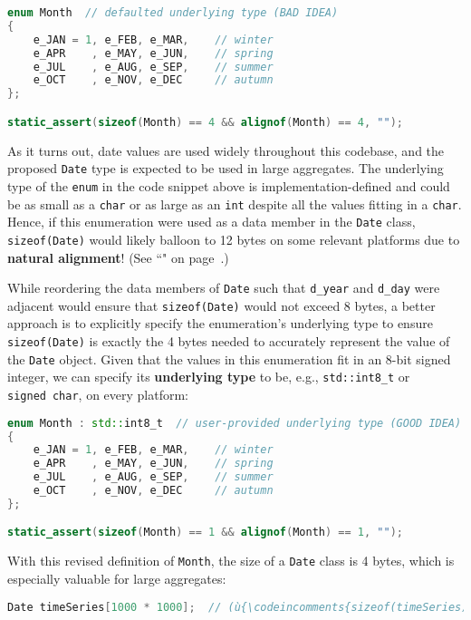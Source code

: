 \begin{lstlisting}[language=C++]
enum Month  // defaulted underlying type (BAD IDEA)
{
    e_JAN = 1, e_FEB, e_MAR,    // winter
    e_APR    , e_MAY, e_JUN,    // spring
    e_JUL    , e_AUG, e_SEP,    // summer
    e_OCT    , e_NOV, e_DEC     // autumn
};

static_assert(sizeof(Month) == 4 && alignof(Month) == 4, "");
\end{lstlisting}

\noindent As it turns out, date values are used widely throughout this codebase,
and the proposed \texttt{Date} type is expected to be used in large
aggregates. The underlying type of the \texttt{enum} in the code snippet
above is implementation-defined and could be as small as a \texttt{char}
or as large as an \texttt{int} despite all the values fitting in a
\texttt{char}. Hence, if this enumeration were used as a data member in
the \texttt{Date} class, \texttt{sizeof(Date)} would likely balloon to
12 bytes on some relevant platforms due to \textbf{natural alignment}!
(See ``" on page~\pageref{alignas}.)

While reordering the data members of \texttt{Date} such that \texttt{d\_year} and
\texttt{d\_day} were adjacent would ensure that \texttt{sizeof(Date)}
would not exceed 8 bytes, a better approach is to explicitly specify the
enumeration's underlying type to ensure \texttt{sizeof(Date)} is exactly
the 4 bytes needed to accurately represent the value of the
\texttt{Date} object. Given that the values in this enumeration fit in
an 8-bit signed integer, we can specify its \textbf{underlying type} to
be, e.g., \texttt{std::int8\_t} or \texttt{signed}~\texttt{char}, on
every platform:

\begin{lstlisting}[language=C++]
enum Month : std::int8_t  // user-provided underlying type (GOOD IDEA)
{
    e_JAN = 1, e_FEB, e_MAR,    // winter
    e_APR    , e_MAY, e_JUN,    // spring
    e_JUL    , e_AUG, e_SEP,    // summer
    e_OCT    , e_NOV, e_DEC     // autumn
};

static_assert(sizeof(Month) == 1 && alignof(Month) == 1, "");
\end{lstlisting}

\noindent With this revised definition of \texttt{Month}, the size of a
\texttt{Date} class is 4 bytes, which is especially valuable for large
aggregates:

\begin{lstlisting}[language=C++]
Date timeSeries[1000 * 1000];  // (ù{\codeincomments{sizeof(timeSeries)}}ù) is now 4Mb (not 12Mb)
\end{lstlisting}



